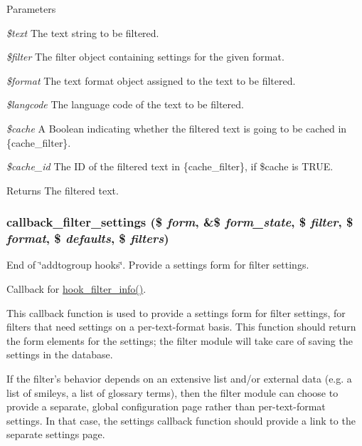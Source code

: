 \begin{DoxyParams}{Parameters}
\item[{\em \$text}]The text string to be filtered. \item[{\em \$filter}]The filter object containing settings for the given format. \item[{\em \$format}]The text format object assigned to the text to be filtered. \item[{\em \$langcode}]The language code of the text to be filtered. \item[{\em \$cache}]A Boolean indicating whether the filtered text is going to be cached in \{cache\_\-filter\}. \item[{\em \$cache\_\-id}]The ID of the filtered text in \{cache\_\-filter\}, if \$cache is TRUE.\end{DoxyParams}
\begin{DoxyReturn}{Returns}
The filtered text. 
\end{DoxyReturn}
\hypertarget{group__callbacks_gac9ccfeb3980f8eaa8b3717e98a1e48e2}{
\subsubsection[{callback\_\-filter\_\-settings}]{\setlength{\rightskip}{0pt plus 5cm}callback\_\-filter\_\-settings (\$ {\em form}, \/  \&\$ {\em form\_\-state}, \/  \$ {\em filter}, \/  \$ {\em format}, \/  \$ {\em defaults}, \/  \$ {\em filters})}}
\label{group__callbacks_gac9ccfeb3980f8eaa8b3717e98a1e48e2}
End of \char`\"{}addtogroup hooks\char`\"{}. Provide a settings form for filter settings.

Callback for \hyperlink{group__hooks_gaf2a2f2a46589420df896a0d42247f15a}{hook\_\-filter\_\-info()}.

This callback function is used to provide a settings form for filter settings, for filters that need settings on a per-\/text-\/format basis. This function should return the form elements for the settings; the filter module will take care of saving the settings in the database.

If the filter's behavior depends on an extensive list and/or external data (e.g. a list of smileys, a list of glossary terms), then the filter module can choose to provide a separate, global configuration page rather than per-\/text-\/format settings. In that case, the settings callback function should provide a link to the separate settings page.


